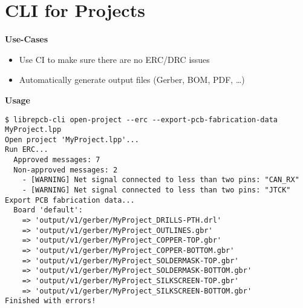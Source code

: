 \section{CLI for Projects}

\begin{frame}[fragile]{\secname}
  \textbf{Use-Cases}
  \begin{itemize}
    \item Use CI to make sure there are no ERC/DRC issues
    \item Automatically generate output files (Gerber, BOM, PDF, \ldots)
  \end{itemize}

  \bigskip

  \textbf{Usage}
  \scriptsize
  \begin{verbatim}
$ librepcb-cli open-project --erc --export-pcb-fabrication-data MyProject.lpp
Open project 'MyProject.lpp'...
Run ERC...
  Approved messages: 7
  Non-approved messages: 2
    - [WARNING] Net signal connected to less than two pins: "CAN_RX"
    - [WARNING] Net signal connected to less than two pins: "JTCK"
Export PCB fabrication data...
  Board 'default':
    => 'output/v1/gerber/MyProject_DRILLS-PTH.drl'
    => 'output/v1/gerber/MyProject_OUTLINES.gbr'
    => 'output/v1/gerber/MyProject_COPPER-TOP.gbr'
    => 'output/v1/gerber/MyProject_COPPER-BOTTOM.gbr'
    => 'output/v1/gerber/MyProject_SOLDERMASK-TOP.gbr'
    => 'output/v1/gerber/MyProject_SOLDERMASK-BOTTOM.gbr'
    => 'output/v1/gerber/MyProject_SILKSCREEN-TOP.gbr'
    => 'output/v1/gerber/MyProject_SILKSCREEN-BOTTOM.gbr'
Finished with errors!
  \end{verbatim}
\end{frame}
